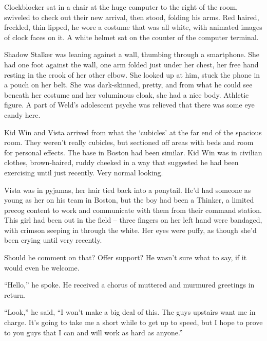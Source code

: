 Clockblocker sat in a chair at the huge computer to the right of the room, swiveled to check out their new arrival, then stood, folding his arms.  Red haired, freckled, thin lipped, he wore a costume that was all white, with animated images of clock faces on it.  A white helmet sat on the counter of the computer terminal.



Shadow Stalker was leaning against a wall, thumbing through a smartphone.  She had one foot against the wall, one arm folded just under her chest, her free hand resting in the crook of her other elbow.  She looked up at him, stuck the phone in a pouch on her belt.  She was dark-skinned, pretty, and from  what he could see beneath her costume and her voluminous cloak, she had a nice body.  Athletic figure.  A part of Weld's adolescent psyche was relieved that there was some eye candy here.



Kid Win and Vista arrived from what the `cubicles' at the far end of the spacious room.  They weren't really cubicles, but sectioned off areas with beds and room for personal effects.  The base in Boston had been similar.  Kid Win was in civilian clothes, brown-haired, ruddy cheeked in a way that suggested he had been exercising until just recently.  Very normal looking.



Vista was in pyjamas, her hair tied back into a ponytail.  He'd had someone as young as her on his team in Boston, but the boy had been a Thinker, a limited precog content to work and communicate with them from their command station.  This girl had been out in the field – three fingers on her left hand were bandaged, with crimson seeping in through the white.  Her eyes were puffy, as though she'd been crying until very recently.



Should he comment on that?  Offer support?  He wasn't sure what to say, if it would even be welcome.



``Hello,'' he spoke.  He received a chorus of muttered and murmured greetings in return.



``Look,'' he said, ``I won't make a big deal of this.  The guys upstairs want me in charge.  It's going to take me a short while to get up to speed, but I hope to prove to you guys that I can and will work as hard as anyone.''



